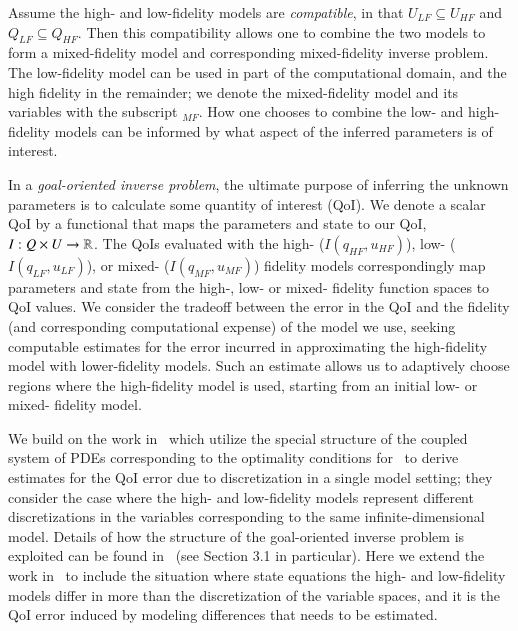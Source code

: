 Assume the high- and low-fidelity models are \emph{compatible}, in that $U_{LF}\subseteq U_{HF}$ and $Q_{LF}\subseteq Q_{HF}$. Then this compatibility allows one to combine the two models to form a mixed-fidelity model and corresponding mixed-fidelity inverse problem. The low-fidelity model can be used in part of the computational domain, and the high fidelity in the remainder; we denote the mixed-fidelity model and its variables with the subscript $_{MF}$. How one chooses to combine the low- and high-fidelity models can be informed by what aspect of the inferred parameters is of interest.

In a {\em goal-oriented inverse problem}, the ultimate purpose of inferring the unknown parameters is to calculate some quantity of interest (QoI). We denote a scalar QoI by a functional that maps the parameters and state to our QoI, $I:Q \times U \to {\mathbb{R}}$. The QoIs evaluated with the high- ($I(q_{HF},u_{HF})$), low- ($I(q_{LF},u_{LF})$), or mixed- ($I(q_{MF},u_{MF})$) fidelity models correspondingly map parameters and state from the high-, low- or mixed- fidelity function spaces to QoI values. We consider the tradeoff between the error in the QoI and the fidelity (and corresponding computational expense) of the model we use, seeking computable estimates for the error incurred in approximating the high-fidelity model with lower-fidelity models. Such an estimate allows us to adaptively choose regions where the high-fidelity model is used, starting from an initial low- or mixed- fidelity model.


We build on the work in~\cite{BecVex05, becker2004posteriori} which utilize the special structure of the coupled system of PDEs corresponding to the optimality conditions for~ to derive estimates for the QoI error due to discretization in a single model setting; they consider the case where the high- and low-fidelity models represent different discretizations in the variables corresponding to the same infinite-dimensional model. Details of how the structure of the goal-oriented inverse problem is exploited can be found in~\cite{becker2004posteriori} (see Section 3.1 in particular). Here we extend the work in~\cite{BecVex05} to include the situation where state equations the high- and low-fidelity models differ in more than the discretization of the variable spaces, and it is the QoI error induced by modeling differences that needs to be estimated.

